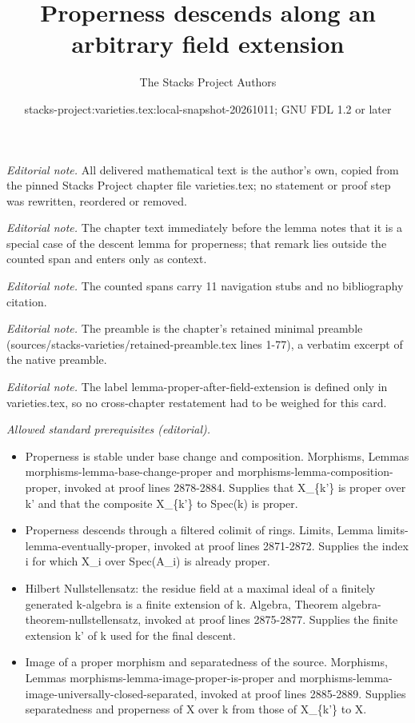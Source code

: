 \documentclass[10pt,a4paper]{amsart}
\title{Properness descends along an arbitrary field extension}
\author{The Stacks Project Authors}
\date{stacks-project:varieties.tex:local-snapshot-20261011; GNU FDL 1.2 or later}
\theoremstyle{plain}
\theoremstyle{definition}
\theoremstyle{remark}
\numberwithin{equation}{subsection}
\begin{document}
\maketitle
\noindent\textit{Editorial note.} All delivered mathematical text is the author's own, copied from the pinned Stacks Project chapter file varieties.tex; no statement or proof step was rewritten, reordered or removed.\par\medskip
\noindent\textit{Editorial note.} The chapter text immediately before the lemma notes that it is a special case of the descent lemma for properness; that remark lies outside the counted span and enters only as context.\par\medskip
\noindent\textit{Editorial note.} The counted spans carry 11 navigation stubs and no bibliography citation.\par\medskip
\noindent\textit{Editorial note.} The preamble is the chapter's retained minimal preamble (sources/stacks-varieties/retained-preamble.tex lines 1-77), a verbatim excerpt of the native preamble.\par\medskip
\noindent\textit{Editorial note.} The label lemma-proper-after-field-extension is defined only in varieties.tex, so no cross-chapter restatement had to be weighed for this card.\par\medskip
\noindent\textit{Allowed standard prerequisites (editorial).}\begin{itemize}
\item Properness is stable under base change and composition. Morphisms, Lemmas morphisms-lemma-base-change-proper and morphisms-lemma-composition-proper, invoked at proof lines 2878-2884. Supplies that X\_\{k'\} is proper over k' and that the composite X\_\{k'\} to Spec(k) is proper.
\item Properness descends through a filtered colimit of rings. Limits, Lemma limits-lemma-eventually-proper, invoked at proof lines 2871-2872. Supplies the index i for which X\_i over Spec(A\_i) is already proper.
\item Hilbert Nullstellensatz: the residue field at a maximal ideal of a finitely generated k-algebra is a finite extension of k. Algebra, Theorem algebra-theorem-nullstellensatz, invoked at proof lines 2875-2877. Supplies the finite extension k' of k used for the final descent.
\item Image of a proper morphism and separatedness of the source. Morphisms, Lemmas morphisms-lemma-image-proper-is-proper and morphisms-lemma-image-universally-closed-separated, invoked at proof lines 2885-2889. Supplies separatedness and properness of X over k from those of X\_\{k'\} to X.
\end{itemize}\medskip
\end{document}
